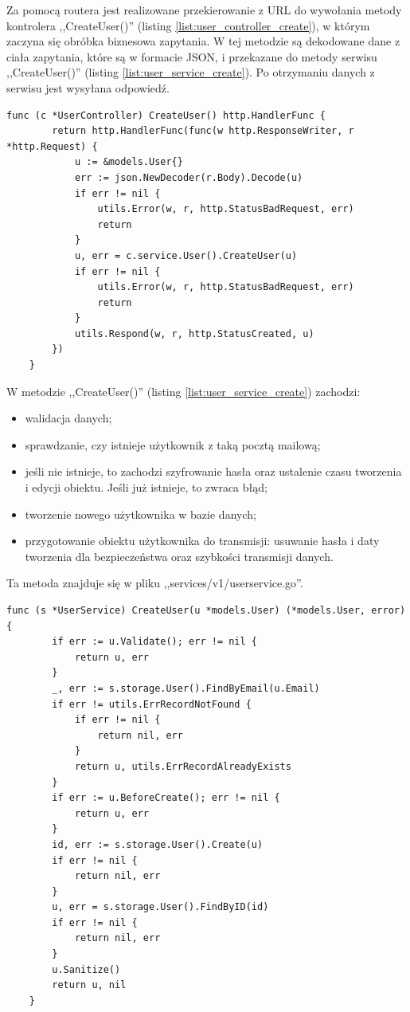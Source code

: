 Za pomocą routera jest realizowane przekierowanie z URL do wywołania metody kontrolera ,,CreateUser()'' (listing \ref{list:user_controller_create}), w którym zaczyna się obróbka biznesowa zapytania.
W tej metodzie są dekodowane dane z ciała zapytania, które są w formacie JSON, i przekazane do metody serwisu ,,CreateUser()'' (listing \ref{list:user_service_create}). Po otrzymaniu danych z serwisu jest wysyłana odpowiedź.
\begin{lstlisting}[label=list:user_controller_create,caption=Kontroler tworzenia użytkownika,basicstyle=\tiny\ttfamily]
    func (c *UserController) CreateUser() http.HandlerFunc {
        return http.HandlerFunc(func(w http.ResponseWriter, r *http.Request) {
            u := &models.User{}
            err := json.NewDecoder(r.Body).Decode(u)
            if err != nil {
                utils.Error(w, r, http.StatusBadRequest, err)
                return
            }
            u, err = c.service.User().CreateUser(u)
            if err != nil {
                utils.Error(w, r, http.StatusBadRequest, err)
                return
            }
            utils.Respond(w, r, http.StatusCreated, u)
        })
    }
\end{lstlisting}

W metodzie ,,CreateUser()'' (listing \ref{list:user_service_create}) zachodzi:
\begin{itemize}
    \item walidacja danych;
    \item sprawdzanie, czy istnieje użytkownik z taką pocztą mailową;
    \item jeśli nie istnieje, to zachodzi szyfrowanie hasła oraz ustalenie czasu tworzenia i edycji obiektu. Jeśli już istnieje, to zwraca błąd;
    \item tworzenie nowego użytkownika w bazie danych;
    \item przygotowanie obiektu użytkownika do transmisji: usuwanie hasła i daty tworzenia dla bezpieczeństwa oraz szybkości transmisji danych.
\end{itemize}
Ta metoda znajduje się w pliku ,,services/v1/userservice.go''.
\begin{lstlisting}[label=list:user_service_create,caption=Serwis tworzenia użytkownika,basicstyle=\tiny\ttfamily]
    func (s *UserService) CreateUser(u *models.User) (*models.User, error) {
        if err := u.Validate(); err != nil {
            return u, err
        }
        _, err := s.storage.User().FindByEmail(u.Email)
        if err != utils.ErrRecordNotFound {
            if err != nil {
                return nil, err
            }
            return u, utils.ErrRecordAlreadyExists
        }
        if err := u.BeforeCreate(); err != nil {
            return u, err
        }
        id, err := s.storage.User().Create(u)
        if err != nil {
            return nil, err
        }
        u, err = s.storage.User().FindByID(id)
        if err != nil {
            return nil, err
        }
        u.Sanitize()
        return u, nil
    }
\end{lstlisting}

